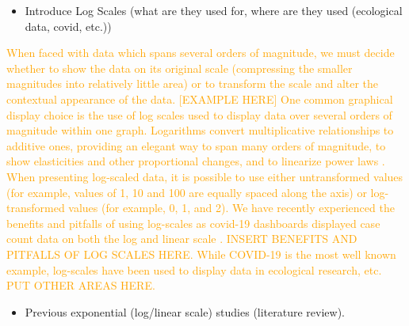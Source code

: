 \documentclass[]{interact}
\theoremstyle{plain}%
\theoremstyle{definition}
\theoremstyle{remark}
\def\tightlist{}
\begin{document}
\begin{itemize}
\tightlist
\item
  Introduce Log Scales (what are they used for, where are they used
  (ecological data, covid, etc.))
\end{itemize}

\textcolor{Orange}{
When faced with data which spans several orders of magnitude, we must decide whether to show the data on its original scale (compressing the smaller magnitudes into relatively little area) or to transform the scale and alter the contextual appearance of the data. [EXAMPLE HERE]
One common graphical display choice is the use of log scales used to display data over several orders of magnitude within one graph. 
Logarithms convert multiplicative relationships to additive ones, providing an elegant way to span many orders of magnitude, to show elasticities and other proportional changes, and to linearize power laws \citep{menge_logarithmic_2018}. 
When presenting log-scaled data, it is possible to use either untransformed values (for example, values of 1, 10 and 100 are equally spaced along the axis) or log-transformed values (for example, 0, 1, and 2). 
We have recently experienced the benefits and pitfalls of using log-scales as covid-19 dashboards displayed case count data on both the log and linear scale \citep{wade_fagen_ulmschneider_2020}. 
INSERT BENEFITS AND PITFALLS OF LOG SCALES HERE. 
While COVID-19 is the most well known example, log-scales have been used to display data in ecological research, etc. 
PUT OTHER AREAS HERE.
}

\begin{itemize}
\tightlist
\item
  Previous exponential (log/linear scale) studies (literature review).
\end{itemize}
\end{document}
